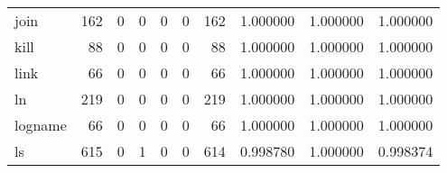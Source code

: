 \begin{longtable}{lrrrrrrrrr}
join      &                                   162 &                                                  0 &                                                  0 &                                                  0 &                                                  0 &                                                162 &                                           1.000000 &                               1.000000 &                             1.000000 \\
kill      &                                    88 &                                                  0 &                                                  0 &                                                  0 &                                                  0 &                                                 88 &                                           1.000000 &                               1.000000 &                             1.000000 \\
link      &                                    66 &                                                  0 &                                                  0 &                                                  0 &                                                  0 &                                                 66 &                                           1.000000 &                               1.000000 &                             1.000000 \\
ln        &                                   219 &                                                  0 &                                                  0 &                                                  0 &                                                  0 &                                                219 &                                           1.000000 &                               1.000000 &                             1.000000 \\
logname   &                                    66 &                                                  0 &                                                  0 &                                                  0 &                                                  0 &                                                 66 &                                           1.000000 &                               1.000000 &                             1.000000 \\
ls        &                                   615 &                                                  0 &                                                  1 &                                                  0 &                                                  0 &                                                614 &                                           0.998780 &                               1.000000 &                             0.998374 \\

\end{longtable}
